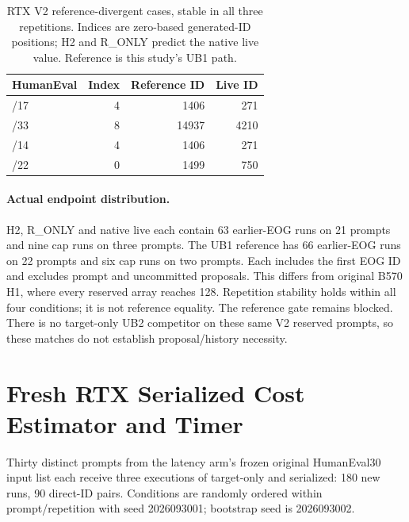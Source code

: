 \begin{table}[t]
\caption{RTX V2 reference-divergent cases, stable in all three repetitions. Indices are zero-based generated-ID positions; H2 and R\_ONLY predict the native live value. Reference is this study's UB1 path.}
\label{tab:rtxdivergences}
\centering
\begin{tabular}{lrrr}
\toprule
HumanEval & Index & Reference ID & Live ID \\
\midrule
/17 & 4 & 1406 & 271 \\
/33 & 8 & 14937 & 4210 \\
/14 & 4 & 1406 & 271 \\
/22 & 0 & 1499 & 750 \\
\bottomrule
\end{tabular}
\end{table}

\paragraph{Actual endpoint distribution.}
H2, R\_ONLY and native live each contain 63 earlier-EOG runs on 21 prompts and nine cap runs on three prompts. The UB1 reference has 66 earlier-EOG runs on 22 prompts and six cap runs on two prompts. Each includes the first EOG ID and excludes prompt and uncommitted proposals. This differs from original B570 H1, where every reserved array reaches 128. Repetition stability holds within all four conditions; it is not reference equality. The reference gate remains blocked. There is no target-only UB2 competitor on these same V2 reserved prompts, so these matches do not establish proposal/history necessity.

\section{Fresh RTX Serialized Cost Estimator and Timer}
Thirty distinct prompts from the latency arm's frozen original HumanEval30 input list each receive three executions of target-only and serialized: 180 new runs, 90 direct-ID pairs. Conditions are randomly ordered within prompt/repetition with seed 2026093001; bootstrap seed is 2026093002.

